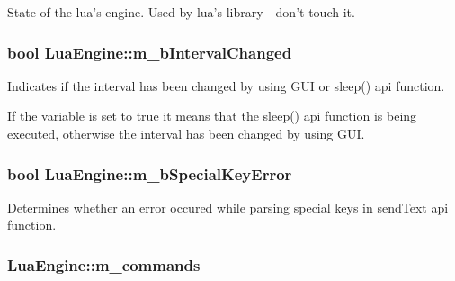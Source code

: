 State of the lua's engine. Used by lua's library -\/ don't touch it. 

\hypertarget{class_lua_engine_add74083d158ee3543d0644c0b6349c5d}{
\subsubsection[{m\-\_\-b\-Interval\-Changed}]{\setlength{\rightskip}{0pt plus 5cm}bool Lua\-Engine\-::m\-\_\-b\-Interval\-Changed\hspace{0.3cm}{\ttfamily [private]}}}\label{class_lua_engine_add74083d158ee3543d0644c0b6349c5d}


Indicates if the interval has been changed by using G\-U\-I or sleep() api function. 

If the variable is set to true it means that the sleep() api function is being executed, otherwise the interval has been changed by using G\-U\-I. \hypertarget{class_lua_engine_a5cac380e1359eb5a6cf95239e4ad2b19}{
\subsubsection[{m\-\_\-b\-Special\-Key\-Error}]{\setlength{\rightskip}{0pt plus 5cm}bool Lua\-Engine\-::m\-\_\-b\-Special\-Key\-Error\hspace{0.3cm}{\ttfamily [private]}}}\label{class_lua_engine_a5cac380e1359eb5a6cf95239e4ad2b19}


Determines whether an error occured while parsing special keys in send\-Text api function. 

\hypertarget{class_lua_engine_a86a3f32127e36e1ccce6c5a42a298ad5}{
\subsubsection[{m\-\_\-commands}]{ Lua\-Engine\-::m\-\_\-commands\hspace{0.3cm}{\ttfamily [private]}}}\label{class_lua_engine_a86a3f32127e36e1ccce6c5a42a298ad5}


